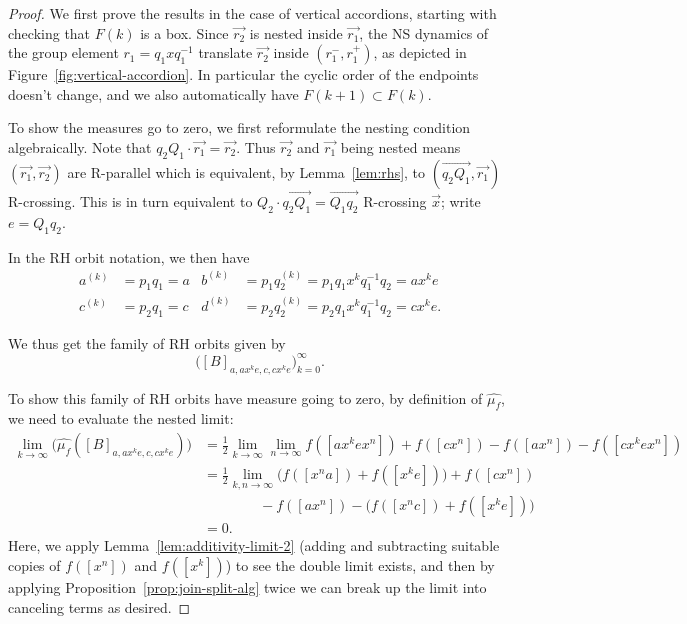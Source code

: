 \documentclass[11pt]{amsart}
\newcommand{\ora}[1]{\overrightarrow{#1}}
\numberwithin{equation}{section}
\numberwithin{figure}{section}
\theoremstyle{definition}
\theoremstyle{plain}
\newcommand*{\wh}[1]{\widehat{#1}}
\begin{document}
\begin{proof}
  We first prove the results in the case of vertical accordions,
  starting with checking that $F(k)$ is a box. Since $\ora{r_2}$ is
  nested inside $\ora{r_1}$, the NS dynamics of the group element $r_1
  = q_1 x q_1^{-1}$ translate $\ora{r_2}$ inside $(r_1^-,r_1^+)$, as depicted
  in Figure~\ref{fig:vertical-accordion}. In particular the cyclic
  order of the endpoints doesn't change, and we also automatically
  have $F(k+1) \subset F(k)$.

  To show the measures go to zero, we first reformulate the nesting
  condition algebraically. Note that
  $q_2Q_1 \cdot \ora{r_1} = \ora{r_2}$. Thus  $\ora{r_2}$ and $\ora{r_1}$ being nested means $(\ora{r_1},\ora{r_2})$ are R-parallel which is equivalent, by Lemma~\ref{lem:rhs}, to $(\ora{q_2Q_1}, \ora{r_1})$ R-crossing. This is
  in turn equivalent to $Q_2 \cdot \ora{q_2Q_1} = \ora{Q_1q_2}$
  R-crossing $\ora{x}$; write $e = Q_1q_2$.

  In the RH orbit notation, we then have
  \begin{align*}
    a^{(k)} &= p_1 q_1 = a &
    b^{(k)} &= p_1 q_2^{(k)} = p_1 q_1 x^k q_1^{-1}q_2 = a x^k e\\
    c^{(k)} &= p_2 q_1 = c &
    d^{(k)} &= p_2 q_2^{(k)} = p_2 q_1 x^k q_1^{-1} q_2 = c x^k e.
  \end{align*}

We thus get the family of RH orbits given by
\[
\bigl([B]_{a,a x^k e,c,c x^k e}\bigr)_{k=0}^\infty.
\]

To show this family of RH orbits have measure going to zero,
by definition of $\wh{\mu_f}$, we need to evaluate the nested limit:
\begin{align*}
  \lim_{k \to \infty} \bigl(\wh{\mu_f}([B]_{a,ax^ke,c,cx^ke})\bigr)
   &= \frac{1}{2}\lim_{k \to \infty} \lim_{n\to \infty} f([ax^ke x^n]) +
     f([cx^n])-f([ax^n])-f([cx^kex^n]) \\
  &= \frac{1}{2}\lim_{k,n \to \infty} \bigl(f([x^n a]) + f([x^ke])\bigr) + f([cx^n])\\
  &\qquad\qquad-f([ax^n])-\bigl(f([x^nc]) + f([x^ke])\bigr)\\
  &= 0.
\end{align*}
Here, we apply Lemma~\ref{lem:additivity-limit-2}
(adding and subtracting suitable copies of $f([x^n])$ and $f([x^k])$)
to see the double limit
exists, and then by applying Proposition~\ref{prop:join-split-alg} twice we
can break up the limit into canceling terms as desired.


\end{proof}
\end{document}
